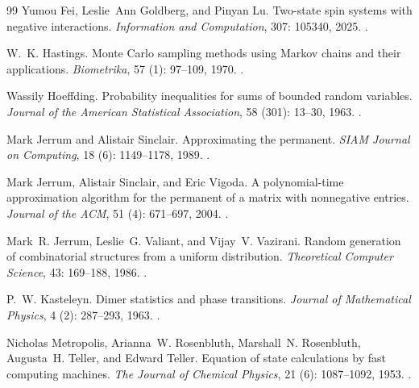 \documentclass[11pt]{article}
\theoremstyle{definition}
\theoremstyle{remark}
\numberwithin{equation}{section}
\begin{document}
\begin{thebibliography}{99}
Yumou Fei, Leslie~Ann Goldberg, and Pinyan Lu.
\newblock Two-state spin systems with negative interactions.
\newblock \emph{Information and Computation}, 307: 105340, 2025.
\newblock {}.

W.~K. Hastings.
\newblock Monte Carlo sampling methods using Markov chains and their applications.
\newblock \emph{Biometrika}, 57 (1): 97--109, 1970.
\newblock {}.

Wassily Hoeffding.
\newblock Probability inequalities for sums of bounded random variables.
\newblock \emph{Journal of the American Statistical Association}, 58
  (301): 13--30, 1963.
\newblock {}.

Mark Jerrum and Alistair Sinclair.
\newblock Approximating the permanent.
\newblock \emph{SIAM Journal on Computing}, 18 (6):
  1149--1178, 1989.
\newblock {}.

Mark Jerrum, Alistair Sinclair, and Eric Vigoda.
\newblock A polynomial-time approximation algorithm for the permanent of a
  matrix with nonnegative entries.
\newblock \emph{Journal of the ACM}, 51 (4): 671--697, 2004.
\newblock {}.

Mark~R. Jerrum, Leslie~G. Valiant, and Vijay~V. Vazirani.
\newblock Random generation of combinatorial structures from a uniform
  distribution.
\newblock \emph{Theoretical Computer Science}, 43: 169--188, 1986.
\newblock {}.

P.~W. Kasteleyn.
\newblock Dimer statistics and phase transitions.
\newblock \emph{Journal of Mathematical Physics}, 4 (2):
  287--293, 1963.
\newblock {}.

Nicholas Metropolis, Arianna~W. Rosenbluth, Marshall~N. Rosenbluth,
Augusta~H. Teller, and Edward Teller.
\newblock Equation of state calculations by fast computing machines.
\newblock \emph{The Journal of Chemical Physics}, 21
  (6): 1087--1092, 1953.
\newblock {}.


\end{thebibliography}
\end{document}
